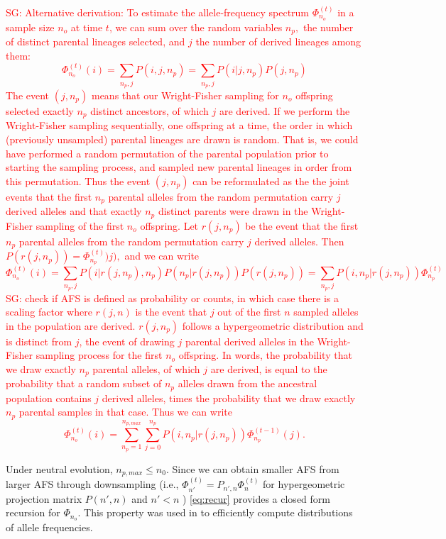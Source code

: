 \documentclass[review]{elsarticle}
\newcommand{\afs}[2]{\Phi_{#1}^{(#2)}}
\newcommand{\sgcomment}[1]{\textcolor{red}{SG: #1}}
\begin{document}
\sgcomment{Alternative derivation:
To estimate the allele-frequency spectrum $\afs{n_o}{t}$ in a sample size $n_o$ at time $t$, 
we can sum over the random variables $n_p,$ the number of distinct parental lineages selected, and $j$ 
the number of derived lineages among them:
 $$\afs{n_o}{t}(i)=\sum_{n_p,j} P(i,j,n_p) =  \sum_{n_p,j} P(i | j,n_p) P(j,n_p) $$
The event $(j,n_p)$ means that our Wright-Fisher sampling for $n_o$ offspring selected exactly $n_p$ distinct ancestors, 
of which $j$ are derived. 
If we perform the Wright-Fisher sampling sequentially, one offspring at a time, the order in which (previously 
unsampled) parental lineages are drawn is random. That is, we could have performed a random permutation of the 
parental population prior to starting the sampling process, and sampled new parental lineages in order from this permutation.  
Thus the event $(j,n_p)$ can be reformulated as the the joint events that the first $n_p$ parental alleles from the random 
permutation carry $j$ derived alleles and that exactly $n_p$ distinct parents were drawn in the Wright-Fisher sampling of the first $n_o$ 
offspring. Let $r(j,n_p)$ be the event that the first $n_p$ parental alleles from the random permutation carry $j$ derived alleles. Then $P(r(j,n_p)) =\afs{n_p}{t} )j),$ and we can write
$$\afs{n_o}{t}(i)=\sum_{n_p,j} P(i | r(j,n_p), n_p)  P(n_p | r(j,n_p) ) P(r(j,n_p)) = \sum_{n_p,j} P(i,n_p | r(j,n_p))  \afs{n_p}{t}$$
 \sgcomment{check if AFS is defined as probability or counts, in which case there is a scaling factor} where $r(j,n)$ is the event that $j$ out of the first $n$ sampled alleles in the population are derived. $r(j,n_p)$ follows a hypergeometric distribution and is distinct from $j$, the event of drawing $j$ parental derived alleles in the Wright-Fisher sampling process for the first $n_o$ offspring.
In words, the probability that we draw exactly $n_p$ parental alleles, of which $j$ are derived, is equal to the probability that a random subset of $n_p$ alleles drawn from the ancestral population contains $j$ derived alleles, times the probability that we draw exactly $n_p$ parental samples in that case.
Thus we can write
 \begin{equation}
\label{eq:recur}
 \afs{n_o}{t}(i)= \sum_{n_p=1}^{n_{p,max}} \sum_{j=0}^{n_p} P(i, n_p | r(j,n_p)) \afs{n_p}{t-1}(j).
\end{equation}
}

Under neutral evolution, $n_{p,max}\leq n_0$. Since we can obtain smaller AFS from larger AFS through downsampling (i.e., $\afs{n'}{t}  = P_{n',n} \afs{n}{t}$ for hypergeometric projection matrix $P(n',n)$ and $n'<n$ )  \eqref{eq:recur} provides a closed form recursion for $\Phi_{n_o}.$ 
This property was used in \cite{JouganousEtAl2017} to efficiently compute distributions of allele frequencies.  
\end{document}
